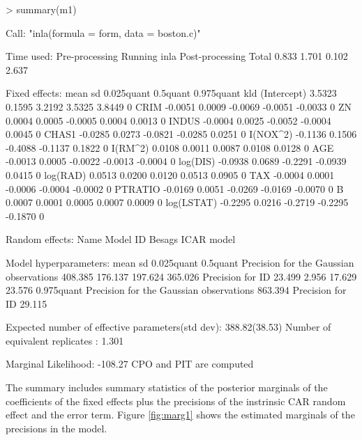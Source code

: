 \documentclass[article]{jss}
\begin{document}
\begin{Schunk}
\begin{Sinput}
> summary(m1)
\end{Sinput}
\begin{Soutput}
Call:
"inla(formula = form, data = boston.c)"

Time used:
 Pre-processing    Running inla Post-processing           Total 
          0.833           1.701           0.102           2.637 

Fixed effects:
               mean     sd 0.025quant 0.5quant 0.975quant kld
(Intercept)  3.5323 0.1595     3.2192   3.5325     3.8449   0
CRIM        -0.0051 0.0009    -0.0069  -0.0051    -0.0033   0
ZN           0.0004 0.0005    -0.0005   0.0004     0.0013   0
INDUS       -0.0004 0.0025    -0.0052  -0.0004     0.0045   0
CHAS1       -0.0285 0.0273    -0.0821  -0.0285     0.0251   0
I(NOX^2)    -0.1136 0.1506    -0.4088  -0.1137     0.1822   0
I(RM^2)      0.0108 0.0011     0.0087   0.0108     0.0128   0
AGE         -0.0013 0.0005    -0.0022  -0.0013    -0.0004   0
log(DIS)    -0.0938 0.0689    -0.2291  -0.0939     0.0415   0
log(RAD)     0.0513 0.0200     0.0120   0.0513     0.0905   0
TAX         -0.0004 0.0001    -0.0006  -0.0004    -0.0002   0
PTRATIO     -0.0169 0.0051    -0.0269  -0.0169    -0.0070   0
B            0.0007 0.0001     0.0005   0.0007     0.0009   0
log(LSTAT)  -0.2295 0.0216    -0.2719  -0.2295    -0.1870   0

Random effects:
Name	  Model
 ID   Besags ICAR model 

Model hyperparameters:
                                        mean    sd      0.025quant 0.5quant
Precision for the Gaussian observations 408.385 176.137 197.624    365.026 
Precision for ID                         23.499   2.956  17.629     23.576 
                                        0.975quant
Precision for the Gaussian observations 863.394   
Precision for ID                         29.115   

Expected number of effective parameters(std dev): 388.82(38.53)
Number of equivalent replicates : 1.301 

Marginal Likelihood:  -108.27 
CPO and PIT are computed
\end{Soutput}
\end{Schunk}
\noindent
The summary includes summary statistics of the posterior marginals of the
coefficients of the fixed effects plus the precisions of the instrinsic CAR
random effect and the error term. Figure \ref{fig:marg1} shows the estimated
marginals of the precisions in the model.
\end{document}
